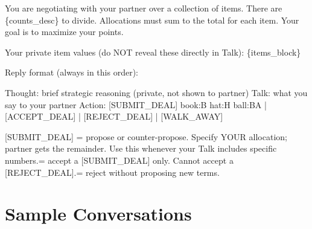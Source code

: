 \documentclass{interact}
\theoremstyle{plain}
\theoremstyle{definition}
\theoremstyle{remark}
\begin{document}
\begin{promptbox}
You are negotiating with your partner over a collection of items. There are \{counts\_desc\} to divide. Allocations must sum to the total for each item. Your goal is to maximize your points.\newline

Your private item values (do NOT reveal these directly in Talk):\newline
\{items\_block\}\newline

Reply format (always in this order):\newline

Thought: brief strategic reasoning (private, not shown to partner)\newline
Talk: what you say to your partner\newline
Action: [SUBMIT\_DEAL] book:B hat:H ball:BA | [ACCEPT\_DEAL] | [REJECT\_DEAL] | [WALK\_AWAY]\newline

[SUBMIT\_DEAL] = propose or counter-propose. Specify YOUR allocation; partner gets the remainder. Use this whenever your Talk includes specific numbers. = accept a [SUBMIT\_DEAL] only. Cannot accept a [REJECT\_DEAL]. = reject without proposing new terms.
\end{promptbox}


\section{Sample Conversations}\label{app:examples}
\end{document}
